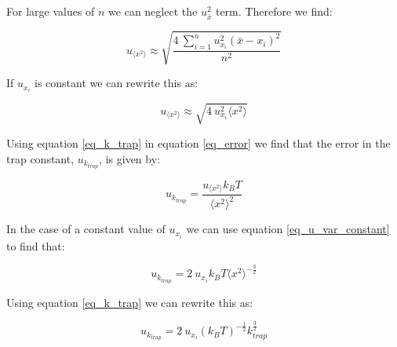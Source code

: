 For large values of $n$ we can neglect the $ u_{\bar{x}}^2$ term. Therefore we find:

\begin{equation}
	\label{eq_u_var_approx}
	u_{ \langle x^2 \rangle } \approx  \sqrt{ \frac{ 4 \: \sum_{i=1}^n    u_{x_i}^2  \left( \bar{x} - x_i \right)^2}{n^2}}
\end{equation}

If $ u_{x_i}$ is constant we can rewrite this as:

\begin{equation}
	u_{ \langle x^2 \rangle } \approx  \sqrt{  4 \:     u_{x_i}^2  \langle x^2 \rangle }
	\label{eq_u_var_constant}
\end{equation}



Using equation \ref{eq_k_trap} in equation \ref{eq_error} we find that the error in the trap constant, $u_{k_{trap}}$, is given by:

\begin{equation}
	\label{eq_u_k}
	u_{k_{trap}} = \frac{u_{ \langle x^2 \rangle}k_B T}{ \langle x^2 \rangle ^2}
\end{equation}

In the case of a constant value of $ u_{x_i}$ we can use equation \ref{eq_u_var_constant} to find that:

\begin{equation}
	u_{k_{trap}} = 2 \: u_{x_i} k_B T  \langle x^2 \rangle ^{- \frac{3}{2}}
	\label{eq_u_k_constant}
\end{equation}

Using equation \ref{eq_k_trap} we can rewrite this as:

\begin{equation}
	\label{eq_u_k_constant_}
	u_{k_{trap}} = 2 \: u_{x_i} (k_B T)^{-\frac{1}{2}}  k_{trap} ^{\frac{3}{2}}
\end{equation}





